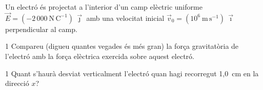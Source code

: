 Un electró és projectat a l'interior d'un camp elèctric uniforme $\vec{E} = (-2\,000\ \mathrm{N\,C^{-1}})\,\vec{\jmath}$ amb una velocitat inicial $\vec{v}_0 = (10^{6}\ \mathrm{m\,s^{-1}})\,\vec{\imath}$ perpendicular al camp.

\begin{apartat}{1}
Compareu (digueu quantes vegades és més gran) la força gravitatòria de l'electró amb la força elèctrica exercida sobre aquest electró.
\end{apartat}

\begin{apartat}{1}
Quant s'haurà desviat verticalment l'electró quan hagi recorregut 1,0~cm en la direcció $x$?
\end{apartat}

